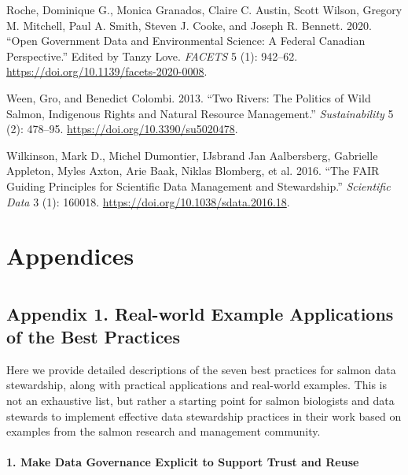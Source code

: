 \documentclass[
  letterpaper,
  DIV=11,
  numbers=noendperiod]{scrartcl}
\makeatletter
\let\oldparagraph\paragraph
\renewcommand{\paragraph}{
    \@ifstar
      \xxxParagraphStar
      \xxxParagraphNoStar
  }
\newcommand{\xxxParagraphStar}[1]{\oldparagraph*{#1}\mbox{}}
\newcommand{\xxxParagraphNoStar}[1]{\oldparagraph{#1}\mbox{}}
\newlength{\cslhangindent}
\newenvironment{CSLReferences}[2] %
 {\begin{list}{}{%
  \setlength{\itemindent}{0pt}
  \setlength{\leftmargin}{0pt}
  \setlength{\parsep}{0pt}
  \ifodd #1
   \setlength{\leftmargin}{\cslhangindent}
   \setlength{\itemindent}{-1\cslhangindent}
  \fi
  \setlength{\itemsep}{#2\baselineskip}}}
 {\end{list}}
\makeatother
\begin{document}
\begin{CSLReferences}{1}{0}
Roche, Dominique G., Monica Granados, Claire C. Austin, Scott Wilson,
Gregory M. Mitchell, Paul A. Smith, Steven J. Cooke, and Joseph R.
Bennett. 2020. {``Open Government Data and Environmental Science: A
Federal Canadian Perspective.''} Edited by Tanzy Love. \emph{FACETS} 5
(1): 942--62. \url{https://doi.org/10.1139/facets-2020-0008}.

Ween, Gro, and Benedict Colombi. 2013. {``Two Rivers: The Politics of
Wild Salmon, Indigenous Rights and Natural Resource Management.''}
\emph{Sustainability} 5 (2): 478--95.
\url{https://doi.org/10.3390/su5020478}.

Wilkinson, Mark D., Michel Dumontier, IJsbrand Jan Aalbersberg,
Gabrielle Appleton, Myles Axton, Arie Baak, Niklas Blomberg, et al.
2016. {``The FAIR Guiding Principles for Scientific Data Management and
Stewardship.''} \emph{Scientific Data} 3 (1): 160018.
\url{https://doi.org/10.1038/sdata.2016.18}.

\end{CSLReferences}

\section{Appendices}\label{appendices}

\section{}\label{section}

\subsection{Appendix 1. Real-world Example Applications of the Best
Practices}\label{appendix-1.-real-world-example-applications-of-the-best-practices}

Here we provide detailed descriptions of the seven best practices for
salmon data stewardship, along with practical applications and
real-world examples. This is not an exhaustive list, but rather a
starting point for salmon biologists and data stewards to implement
effective data stewardship practices in their work based on examples
from the salmon research and management community.

\paragraph{\texorpdfstring{\textbf{1. Make Data Governance Explicit to
Support Trust and
Reuse}}{1. Make Data Governance Explicit to Support Trust and Reuse}}\label{make-data-governance-explicit-to-support-trust-and-reuse}
\end{document}
